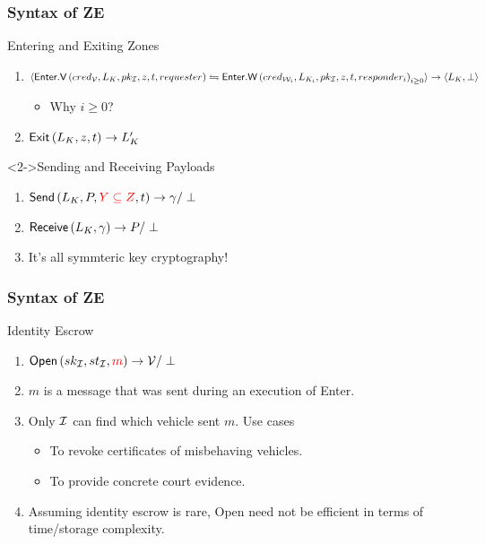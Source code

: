 \documentclass{beamer}
\begin{document}
    \begin{frame}
        \frametitle{Syntax of ZE}
        \begin{block}{Entering and Exiting Zones}
            \begin{enumerate}
                \item \(\langle
                \mathsf{Enter.V}\left(cred_{\mathcal V},L_K,pk_{\mathcal I},z,t,requester\right)
                \leftrightharpoons
                \mathsf{Enter.W}\left(cred_{\mathcal W_i},L_{K_i},pk_{\mathcal I},z,t,responder_i\right)_{i\ge
                0} \rangle \rightarrow \left\langle L_K,\perp \right\rangle\)
                \begin{itemize}
                    \item Why \(i \ge 0\)?
                \end{itemize}
                \item \(\mathsf{Exit}\left(L_K,z,t\right) \rightarrow L_K^{\prime}\)
            \end{enumerate}
        \end{block}
        \begin{block}<2->{Sending and Receiving Payloads}
            \begin{enumerate}
                \item \(\mathsf{Send}\left(L_K,P,\textcolor{red}{Y\subseteq Z},t\right)
                \rightarrow \gamma/\perp\)
                \item \(\mathsf{Receive}\left(L_K,\gamma\right) \rightarrow P/\perp\)
                \item It's all symmteric key cryptography!
            \end{enumerate}
        \end{block}
    \end{frame}

    \begin{frame}
        \frametitle{Syntax of ZE}
        \begin{block}{Identity Escrow}
            \begin{enumerate}
                \item \(\mathsf{Open}\left(sk_{\mathcal I},st_{\mathcal I},\textcolor{red}{m}\right)
                \rightarrow \mathcal V/\perp\)
                \item \(m\) is a message that was sent during an execution of
                \textsf{Enter}.
                \item<2-> Only \(\mathcal I\) can find which vehicle sent \(m\). Use
                cases
                \begin{itemize}
                    \item To revoke certificates of misbehaving vehicles.
                    \item To provide concrete court evidence.
                \end{itemize}
                \item<3-> Assuming identity escrow is rare, \textsf{Open} need
                not be efficient in terms of time/storage complexity.
            \end{enumerate}
        \end{block}
    \end{frame}
\end{document}

